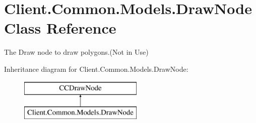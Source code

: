 \hypertarget{classClient_1_1Common_1_1Models_1_1DrawNode}{}\section{Client.\+Common.\+Models.\+Draw\+Node Class Reference}
\label{classClient_1_1Common_1_1Models_1_1DrawNode}


The Draw node to draw polygons.(Not in Use)  


Inheritance diagram for Client.\+Common.\+Models.\+Draw\+Node\+:\begin{figure}[H]
\begin{center}
\leavevmode
\includegraphics[height=2.000000cm]{classClient_1_1Common_1_1Models_1_1DrawNode}
\end{center}
\end{figure}
